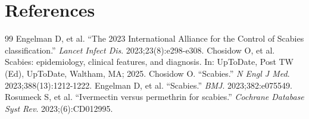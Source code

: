 \section*{References}
\begin{thebibliography}{99}
 Engelman D, et al. ``The 2023 International Alliance for the Control of Scabies classification.'' \emph{Lancet Infect Dis}. 2023;23(8):e298-e308.
 Chosidow O, et al. Scabies: epidemiology, clinical features, and diagnosis. In: UpToDate, Post TW (Ed), UpToDate, Waltham, MA; 2025.
 Chosidow O. ``Scabies.'' \emph{N Engl J Med}. 2023;388(13):1212-1222.
 Engelman D, et al. ``Scabies.'' \emph{BMJ}. 2023;382:e075549.
 Rosumeck S, et al. ``Ivermectin versus permethrin for scabies.'' \emph{Cochrane Database Syst Rev}. 2023;(6):CD012995.
\end{thebibliography}
